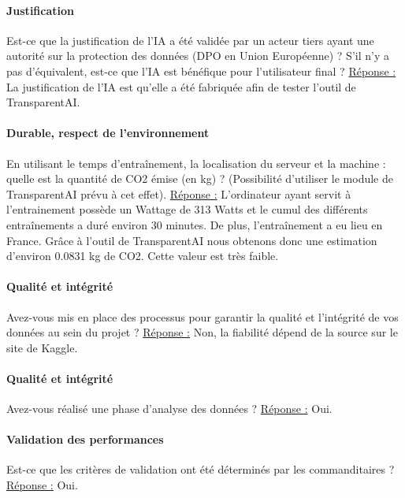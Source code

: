 \documentclass[10pt, french, a4paper]{report}
\begin{document}
\paragraph{Justification} 
Est-ce que la justification de l'IA a été validée par un acteur tiers ayant une autorité sur la protection des données (DPO en Union Européenne) ? S'il n'y a pas d'équivalent, est-ce que l'IA est bénéfique pour l'utilisateur final ?
\newline
\underline{Réponse :} La justification de l'IA est qu'elle a été fabriquée afin de tester l'outil de TransparentAI.

\paragraph{Durable, respect de l'environnement} 
En utilisant le temps d'entraînement, la localisation du serveur et la machine : quelle est la quantité de CO2 émise (en kg) ? (Possibilité d'utiliser le module de TransparentAI prévu à cet effet).
\newline
\underline{Réponse :} L'ordinateur ayant servit à l'entrainement possède un Wattage de 313 Watts et le cumul des différents entraînements a duré environ 30 minutes. De plus, l'entraînement a eu lieu en France. Grâce à l'outil de TransparentAI nous obtenons donc une estimation d'environ 0.0831 kg de CO2. Cette valeur est très faible.

\paragraph{Qualité et intégrité} 
Avez-vous mis en place des processus pour garantir la qualité et l'intégrité de vos données au sein du projet ?
\newline
\underline{Réponse :} Non, la fiabilité dépend de la source sur le site de Kaggle.

\paragraph{Qualité et intégrité} 
Avez-vous réalisé une phase d'analyse des données ?
\newline
\underline{Réponse :} Oui.

\paragraph{Validation des performances} 
Est-ce que les critères de validation ont été déterminés par les commanditaires ?
\newline
\underline{Réponse :} Oui.
\end{document}
